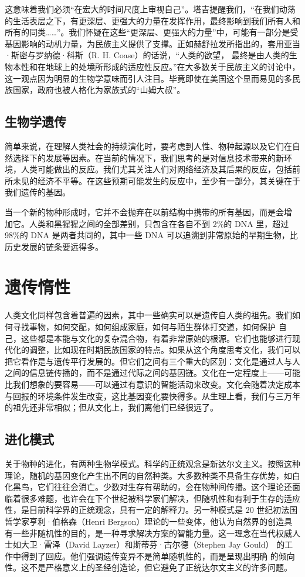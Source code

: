 这意味着我们必须“在宏大的时间尺度上审视自己”。塔吉提醒我们，“在我们动荡的生活表层之下，有更深层、更强大的力量在发挥作用，最终影响到我们所有人和所有的同类……”。我们怀疑在这些“更深层、更强大的力量”中，可能有一部分是受基因影响的动机力量，为民族主义提供了支撑。正如赫舒拉发所指出的，套用亚当·斯密与罗纳德·科斯（R. H. Coase）的话说，“人类的欲望， 最终是由人类的生物本性和在地球上的处境所形成的适应性反应。”在大多数关于民族主义的讨论中，这一观点因为明显的生物学意味而引人注目。毕竟即使在美国这个显而易见的多民族国家，政府也被人格化为家族式的“山姆大叔”。

\subsection{生物学遗传}
简单来说，在理解人类社会的持续演化时，要考虑到人性、物种起源以及它们在自然选择下的发展等因素。在当前的情况下，我们思考的是对信息技术带来的新环境，人类可能做出的反应。我们尤其关注人们对网络经济及其后果的反应，包括前所未见的经济不平等。在这些预期可能发生的反应中，至少有一部分，其关键在于我们遗传的基因。

当一个新的物种形成时，它并不会抛弃在以前结构中携带的所有基因，而是会增 加它。人类和黑猩猩之间的全部差别，只包含在各自不到 2\%的 DNA 里，超过 98\%的 DNA 是两者共同的，其中一些 DNA 可以追溯到非常原始的早期生物，比历史发展的链条要远得多。

\section{遗传惰性}

人类文化同样包含着普遍的因素，其中一些确实可以是遗传自人类的祖先。我们如何寻找事物，如何交配，如何组成家庭，如何与陌生群体打交道，如何保护 自己，这些都是本能与文化的复杂混合物，有着非常原始的根源。它们也能够进行现代化的调整，比如现在时期民族国家的特点。如果从这个角度思考文化，我们可以把它看作是与遗传平行发展的。但它们之间有三个重大的区别：文化是通过人与人之间的信息链传播的，而不是通过代际之间的基因链。文化在一定程度上——可能比我们想象的要容易——可以通过有意识的智能活动来改变。文化会随着决定成本与回报的环境条件发生改变，这比基因变化要快得多。从生理上看，我们与三万年的祖先还非常相似；但从文化上，我们离他们已经很远了。

\subsection{进化模式}

关于物种的进化，有两种生物学模式。科学的正统观念是新达尔文主义。按照这种理论，随机的基因变化产生出不同的自然种类。大多数种类不具备生存优势，如白化黑鸟，它们往往会消亡。少数对生存有帮助的，会在物种间传播。这个理论还面临着很多难题，也许会在下个世纪被科学家们解决，但随机性和有利于生存的适应性，是目前科学界的正统观念，具有一定的解释力。另一种模式是 20  世纪初法国哲学家亨利·伯格森（Henri Bergson）理论的一些变体，他认为自然界的创造具有一些非随机性的目的，是一种寻求解决方案的智能力量。这一理念在当代权威人士如大卫·雷泽（David Layzer）和斯蒂芬·古尔德（Stephen Jay Gould） 的工作中得到了回应。他们强调遗传变异不是简单随机性的，而是呈现出明确 的倾向性。这不是严格意义上的圣经创造论，但它避免了正统达尔文主义的许多问题。

